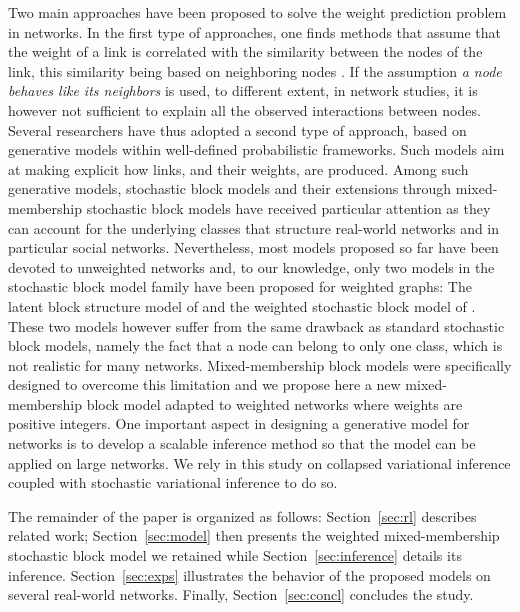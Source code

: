 Two main approaches have been proposed to solve the weight prediction problem \cite{Lu2011} in networks. In the first type of approaches, one finds methods that assume that the weight of a link is correlated with the similarity between the nodes of the link, this similarity being based on neighboring nodes \cite{Zhao2015,Zhu2016}. If the assumption \textit{a node behaves like its neighbors} is used, to different extent, in network studies, it is however not sufficient to explain all the observed interactions between nodes. Several researchers have thus adopted a second type of approach, based on generative models within well-defined probabilistic frameworks. Such models aim at making explicit how links, and their weights, are produced. Among such generative models, stochastic block models and their extensions through mixed-membership stochastic block models have received particular attention \cite{ Karrer2011,airoldi2009mixed,iMMSB,fan2015dynamic} as they can account for the underlying classes that structure real-world networks and in particular social networks. Nevertheless, most models proposed so far have been devoted to unweighted networks and, to our knowledge, only two models in the stochastic block model family have been proposed for weighted graphs: The latent block structure model of \cite{aicher2014learning} and the weighted stochastic block model of \cite{peixoto2018nonparametric}. These two models however suffer from the same drawback as standard stochastic block models, namely the fact that a node can belong to only one class, which is not realistic for many networks. Mixed-membership block models were specifically designed to overcome this limitation and we propose here a new mixed-membership block model adapted to weighted networks where weights are positive integers. One important aspect in designing a generative model for networks is to develop a scalable inference method so that the model can be applied on large networks. We rely in this study on collapsed variational inference coupled with stochastic variational inference to do so.

The remainder of the paper is organized as follows: Section~\ref{sec:rl} describes related work; Section~\ref{sec:model} then presents the weighted mixed-membership stochastic block model we retained while Section~\ref{sec:inference} details its inference. Section~\ref{sec:exps} illustrates the behavior of the proposed models on several real-world networks. Finally, Section~\ref{sec:concl} concludes the study.


